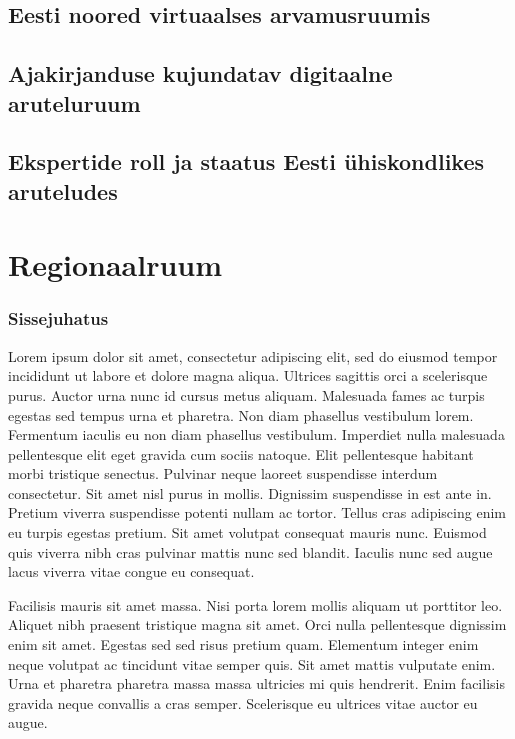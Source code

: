 \documentclass[]{book}
\begin{document}
\hypertarget{chapter13}{%
\section{Eesti noored virtuaalses arvamusruumis}\label{chapter13}}

\hypertarget{chapter14}{%
\section{Ajakirjanduse kujundatav digitaalne aruteluruum}\label{chapter14}}

\hypertarget{chapter15}{%
\section{Ekspertide roll ja staatus Eesti ühiskondlikes aruteludes}\label{chapter15}}

\hypertarget{chapter20}{%
\chapter{Regionaalruum}\label{chapter20}}

\hypertarget{sissejuhatus-1}{%
\subsection*{Sissejuhatus}\label{sissejuhatus-1}}

Lorem ipsum dolor sit amet, consectetur adipiscing elit, sed do eiusmod tempor incididunt ut labore et dolore magna aliqua. Ultrices sagittis orci a scelerisque purus. Auctor urna nunc id cursus metus aliquam. Malesuada fames ac turpis egestas sed tempus urna et pharetra. Non diam phasellus vestibulum lorem. Fermentum iaculis eu non diam phasellus vestibulum. Imperdiet nulla malesuada pellentesque elit eget gravida cum sociis natoque. Elit pellentesque habitant morbi tristique senectus. Pulvinar neque laoreet suspendisse interdum consectetur. Sit amet nisl purus in mollis. Dignissim suspendisse in est ante in. Pretium viverra suspendisse potenti nullam ac tortor. Tellus cras adipiscing enim eu turpis egestas pretium. Sit amet volutpat consequat mauris nunc. Euismod quis viverra nibh cras pulvinar mattis nunc sed blandit. Iaculis nunc sed augue lacus viverra vitae congue eu consequat.

Facilisis mauris sit amet massa. Nisi porta lorem mollis aliquam ut porttitor leo. Aliquet nibh praesent tristique magna sit amet. Orci nulla pellentesque dignissim enim sit amet. Egestas sed sed risus pretium quam. Elementum integer enim neque volutpat ac tincidunt vitae semper quis. Sit amet mattis vulputate enim. Urna et pharetra pharetra massa massa ultricies mi quis hendrerit. Enim facilisis gravida neque convallis a cras semper. Scelerisque eu ultrices vitae auctor eu augue.
\end{document}
